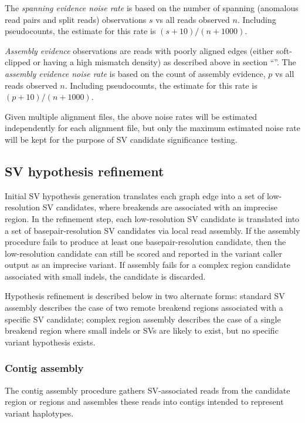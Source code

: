 \documentclass{article}
\begin{document}
The \textit{spanning evidence noise rate} is based on the number of spanning (anomalous read pairs and split reads)  observations $s$ vs all reads observed $n$. Including pseudocounts, the estimate for this rate is $(s + 10) / (n + 1000)$.

\textit{Assembly evidence} observations are reads with poorly aligned edges (either soft-clipped or having a high mismatch density) as described above in section ``''. The \textit{assembly evidence noise rate} is based on the count of assembly evidence, $p$ vs all reads observed $n$. Including pseudocounts, the estimate for this rate is $(p + 10) / (n + 1000)$.

Given multiple alignment files, the above noise rates will be estimated independently for each alignment file, but only the maximum estimated noise rate will be kept for the purpose of SV candidate significance testing.



\subsection{SV hypothesis refinement}

Initial SV hypothesis generation translates each graph edge into a set of low-resolution SV candidates, where breakends are associated with an imprecise region. In the refinement step, each low-resolution SV candidate is translated into a set of basepair-resolution SV candidates via local read assembly. If the assembly procedure fails to produce at least one basepair-resolution candidate, then the low-resolution candidate can still be scored and reported in the variant caller output as an imprecise variant. If assembly fails for a complex region candidate associated with small indels, the candidate is discarded.

Hypothesis refinement is described below in two alternate forms: standard SV assembly describes the case of two remote breakend regions associated with a specific SV candidate; complex region assembly describes the case of a single breakend region where small indels or SVs are likely to exist, but no specific variant hypothesis exists.


\subsubsection{Contig assembly}

The contig assembly procedure gathers SV-associated reads from the candidate region or regions and assembles these reads into contigs intended to represent variant haplotypes.
\end{document}
